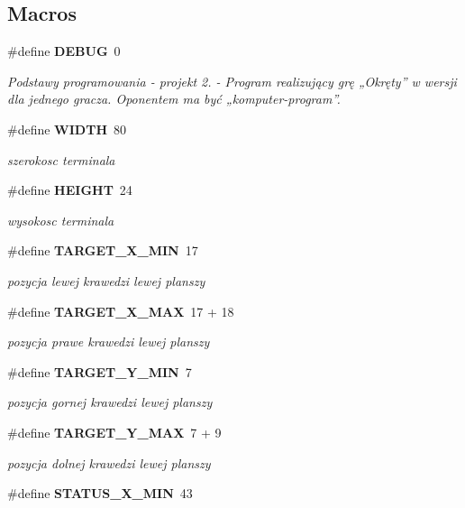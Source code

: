 \subsection*{Macros}
\begin{DoxyCompactItemize}
\item 
\#define \textbf{ D\+E\+B\+UG}~0
\begin{DoxyCompactList}\small\item\em Podstawy programowania -\/ projekt 2. -\/ Program realizujący grę „\+Okręty” w wersji dla jednego gracza. Oponentem ma być „komputer-\/program”. \end{DoxyCompactList}\item 
\#define \textbf{ W\+I\+D\+TH}~80
\begin{DoxyCompactList}\small\item\em szerokosc terminala \end{DoxyCompactList}\item 
\#define \textbf{ H\+E\+I\+G\+HT}~24
\begin{DoxyCompactList}\small\item\em wysokosc terminala \end{DoxyCompactList}\item 
\#define \textbf{ T\+A\+R\+G\+E\+T\+\_\+\+X\+\_\+\+M\+IN}~17
\begin{DoxyCompactList}\small\item\em pozycja lewej krawedzi lewej planszy \end{DoxyCompactList}\item 
\#define \textbf{ T\+A\+R\+G\+E\+T\+\_\+\+X\+\_\+\+M\+AX}~17 + 18
\begin{DoxyCompactList}\small\item\em pozycja prawe krawedzi lewej planszy \end{DoxyCompactList}\item 
\#define \textbf{ T\+A\+R\+G\+E\+T\+\_\+\+Y\+\_\+\+M\+IN}~7
\begin{DoxyCompactList}\small\item\em pozycja gornej krawedzi lewej planszy \end{DoxyCompactList}\item 
\#define \textbf{ T\+A\+R\+G\+E\+T\+\_\+\+Y\+\_\+\+M\+AX}~7 + 9
\begin{DoxyCompactList}\small\item\em pozycja dolnej krawedzi lewej planszy \end{DoxyCompactList}\item 
\#define \textbf{ S\+T\+A\+T\+U\+S\+\_\+\+X\+\_\+\+M\+IN}~43

\end{DoxyCompactItemize}
